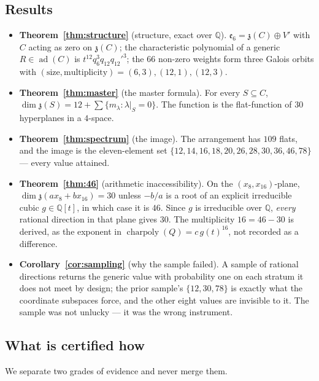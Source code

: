 \documentclass[11pt,a4paper]{article}
\theoremstyle{definition}
\theoremstyle{remark}
\newcommand{\esix}{\mathfrak{e}_6}
\newcommand{\z}{\mathfrak{z}}
\newcommand{\Q}{\mathbb{Q}}
\newcommand{\ad}{\operatorname{ad}}
\newcommand{\charpoly}{\operatorname{charpoly}}
\begin{document}
\subsection{Results}

\begin{itemize}[leftmargin=1.4em]
\item \textbf{Theorem~\ref{thm:structure}} (structure, exact over $\Q$). $\esix=\z(C)\oplus V'$
      with $C$ acting as zero on $\z(C)$; the characteristic polynomial of a generic
      $R\in\ad(C)$ is $t^{12}q_6^{3}q_{12}q_{12}'^{3}$; the $66$ non-zero weights form three
      Galois orbits with $(\text{size},\text{multiplicity})=(6,3),(12,1),(12,3)$.
\item \textbf{Theorem~\ref{thm:master}} (the master formula). For every $S\subseteq C$,
      $\dim\z(S)=12+\sum\{m_\lambda:\lambda|_S=0\}$. The function is the flat-function of $30$
      hyperplanes in a $4$-space.
\item \textbf{Theorem~\ref{thm:spectrum}} (the image). The arrangement has $109$ flats, and the
      image is the eleven-element set $\{12,14,16,18,20,26,28,30,\allowbreak 36,46,78\}$ ---
      every value attained.
\item \textbf{Theorem~\ref{thm:46}} (arithmetic inaccessibility). On the $(x_8,x_{16})$-plane,
      $\dim\z(a x_8+b x_{16})=30$ unless $-b/a$ is a root of an explicit irreducible cubic
      $g\in\Q[t]$, in which case it is $46$. Since $g$ is irreducible over $\Q$, \emph{every}
      rational direction in that plane gives $30$. The multiplicity $16=46-30$ is derived, as
      the exponent in $\charpoly(Q)=c\,g(t)^{16}$, not recorded as a difference.
\item \textbf{Corollary~\ref{cor:sampling}} (why the sample failed). A sample of rational
      directions returns the generic value with probability one on each stratum it does not meet
      by design; the prior sample's $\{12,30,78\}$ is exactly what the coordinate subspaces
      force, and the other eight values are invisible to it. The sample was not unlucky --- it
      was the wrong instrument.
\end{itemize}

\subsection{What is certified how}\label{sec:certification}

We separate two grades of evidence and never merge them.
\end{document}
